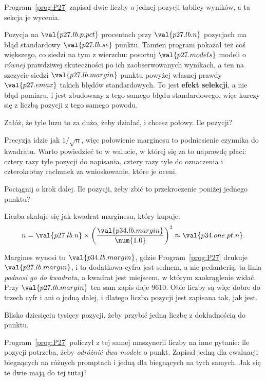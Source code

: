 \begin{fr}
Program~\ref{prog:P27} zapisał dwie liczby o jednej pozycji tablicy wyników,
a ta sekcja je wycenia.

Pozycja na $\val{p27.lb.p.pct}$ procentach przy $\val{p27.lb.n}$ pozycjach ma
błąd standardowy $\val{p27.lb.se}$ punktu. Tamten program pokazał też coś
większego, co siedzi na tym z wierzchu: posortuj $\val{p27.models}$ modeli o
\emph{równej} prawdziwej skuteczności po ich zaobserwowanych wynikach, a ten
na szczycie siedzi $\val{p27.lb.margin}$ punktu powyżej własnej prawdy
\dash{} $\val{p27.emax}$ takich błędów standardowych. To jest \textbf{efekt
selekcji}, a nie błąd pomiaru, i jest zbudowany z tego samego błędu
standardowego, więc kurczy się z liczbą pozycji z tego samego powodu.

Załóż, że tyle luzu to za dużo, żeby działać, i chcesz połowy. Ile pozycji?
\dotline
\nextframe
\end{fr}

\begin{fr}

Precyzja idzie jak $1/\sqrt{n}$, więc połowienie marginesu to podniesienie
czynnika do kwadratu. Warto powiedzieć to w walucie, w której się za to
naprawdę płaci: cztery razy tyle pozycji do napisania, cztery razy tyle do
oznaczenia i czterokrotny rachunek za wnioskowanie, które je oceni.

Pociągnij o krok dalej. Ile pozycji, żeby zbić to przekroczenie poniżej
jednego punktu?
\dotline
\nextframe
\end{fr}

\begin{fr}
\begin{ansblock}
Liczba skaluje się jak kwadrat marginesu, który kupuje:
\[ n = \val{p27.lb.n} \times
   \left(\frac{\val{p34.lb.margin}}{\num{1.0}}\right)^{2}
   \approx \val{p34.one.pt.n} . \]
\end{ansblock}

Margines wynosi tu $\val{p34.lb.margin}$, gdzie Program~\ref{prog:P27}
drukuje $\val{p27.lb.margin}$, i ta dodatkowa cyfra jest sednem, a nie
pedanterią: ta linia \emph{podnosi go do kwadratu}, a kwadrat jest miejscem,
w którym zaokrąglenie widać. Przy $\val{p27.lb.margin}$ ten sam zapis daje
$\num{9610}$. Obie liczby są więc dobre do trzech cyfr i ani o jedną dalej,
i dlatego liczba pozycji jest zapisana tak, jak jest.

Blisko dziesięciu tysięcy pozycji, żeby przybić jedną liczbę z dokładnością do
punktu.

Program~\ref{prog:P27} policzył z tej samej maszynerii liczby na inne
pytanie: ile pozycji potrzeba, żeby \emph{odróżnić dwa modele} o punkt.
Zapisał jedną dla ewaluacji biegnących na różnych promptach i jedną dla
biegnących na tych samych. Jak się te dwie mają do tej tutaj?
\dotline
\nextframe
\end{fr}

